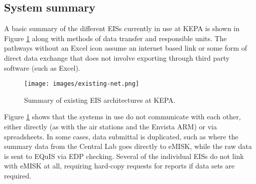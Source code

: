 \subsection{System summary}
A basic summary of the different EISs currently in use at KEPA is shown in Figure \ref{fig:existing} along with methods of data transfer and responsible units. The pathways without an Excel icon assume an internet based link or some form of direct data exchange that does not involve exporting through third party software (such as Excel).

%
\begin{figure}[H]
\centering
\texttt{[image: images/existing-net.png]} 
\caption{Summary of existing EIS architectures at KEPA.}
\label{fig:existing}
\end{figure}
%

Figure \ref{fig:existing} shows that the systems in use do not communicate with each other, either directly (as with the air stations and the Envista ARM) or via spreadsheets. In some cases, data submittal is duplicated, such as where the summary data from the Central Lab goes directly to eMISK, while the raw data is sent to EQuIS via EDP checking. Several of the individual EISs do not link with eMISK at all, requiring hard-copy requests for reports if data sets are required.